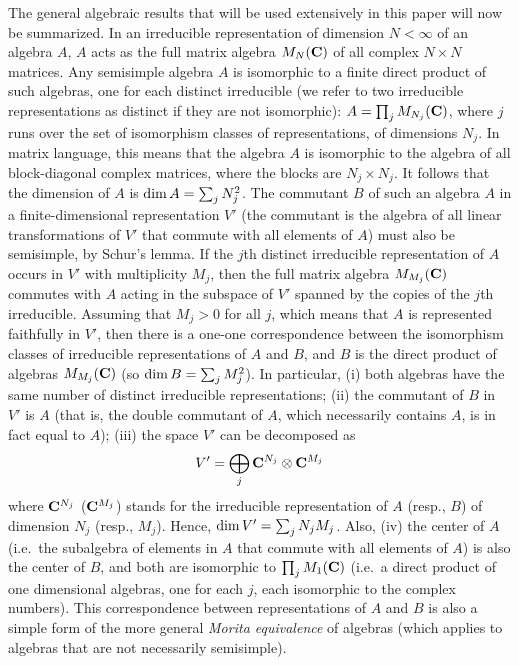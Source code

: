 \documentclass[twocolumn,floats,pra]{revtex4}
\newcommand {\be}{\begin{equation}}
\newcommand {\ee} {\end{equation}}
\begin{document}
The general algebraic results that will be used extensively in
this paper will now be summarized. In an irreducible
representation of dimension $N<\infty$ of an algebra $A$, $A$ acts
as the full matrix algebra $M_N({\bf C})$ of all complex $N\times
N$ matrices. Any semisimple algebra $A$ is isomorphic to a finite
direct product of such algebras, one for each distinct irreducible
(we refer to two irreducible representations as distinct if they
are not isomorphic): $A=\prod_j M_{N_j}({\bf C}) $, where $j$ runs
over the set of isomorphism classes of representations, of
dimensions $N_j$. In matrix language, this means that the algebra
$A$ is isomorphic to the algebra of all block-diagonal complex
matrices, where the blocks are $N_j\times N_j$. It follows that
the dimension of $A$ is ${\rm dim\,} A= \sum_j N_j^2$. The
commutant $B$ of such an algebra $A$ in a finite-dimensional
representation $V'$ (the commutant is the algebra of all linear
transformations of $V'$ that commute with all elements of $A$)
must also be semisimple, by Schur's lemma. If the $j$th distinct
irreducible representation of $A$ occurs in $V'$ with multiplicity
$M_j$, then the full matrix algebra $M_{M_j}({\bf C})$ commutes
with $A$ acting in the subspace of $V'$ spanned by the copies of
the $j$th irreducible. Assuming that $M_j>0$ for all $j$, which
means that $A$ is represented faithfully in $V'$, then there is a
one-one correspondence between the isomorphism classes of
irreducible representations of $A$ and $B$, and $B$ is the direct
product of algebras $M_{M_j}({\bf C})$ (so ${\rm
dim\,}B=\sum_jM_j^2$). In particular, (i) both algebras have the
same number of distinct irreducible representations; (ii) the
commutant of $B$ in $V'$ is $A$ (that is, the double commutant of
$A$, which necessarily contains $A$, is in fact equal to $A$);
(iii) the space $V'$ can be decomposed as
%
\be %
V'=\bigoplus_j {\bf C}^{N_j}\otimes {\bf C}^{M_j}\ee %
where ${\bf C}^{N_j}$ (${\bf C}^{M_j}$) stands for the irreducible
representation of $A$ (resp., $B$) of dimension $N_j$ (resp.,
$M_j$). Hence, ${\rm dim\,} V'=\sum_j N_j M_j$. Also, (iv) the
center of $A$ (i.e.\ the subalgebra of elements in $A$ that
commute with all elements of $A$) is also the center of $B$, and
both are isomorphic to $\prod_j M_1({\bf C})$ (i.e.\ a direct
product of one dimensional algebras, one for each $j$, each
isomorphic to the complex numbers). This correspondence between
representations of $A$ and $B$ is also a simple form of the more
general {\em Morita equivalence} of algebras (which applies to
algebras that are not necessarily semisimple).
\end{document}
